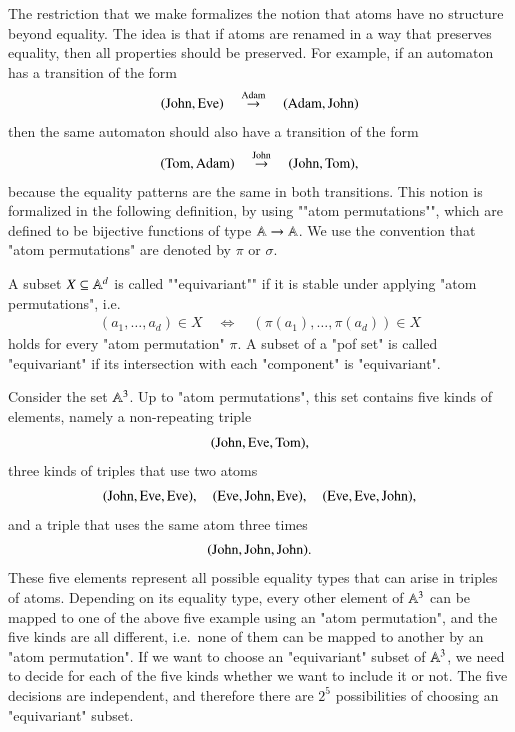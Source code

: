 The restriction that we make formalizes the  notion that atoms have no structure beyond equality. The idea is that if atoms are renamed in a way that preserves equality, then  all properties should be preserved. For example, if an automaton has a transition of the form  
\begin{align*}
(\text{John}, \text{Eve}) 
\quad \stackrel {\text{Adam}} \to \quad 
(\text{Adam}, \text{John})
\end{align*}
then the same automaton should also have a transition of the form 
\begin{align*}
    (\text{Tom}, \text{Adam}) 
    \quad \stackrel {\text{John}} \to \quad 
    (\text{John}, \text{Tom}),
    \end{align*}
because the equality patterns are the same in both transitions. This notion is formalized in the following definition, by using ""atom permutations"", which are  defined to be bijective functions of type $\mathbb A \to \mathbb A$. We use the convention that "atom permutations" are denoted by $\pi$ or $\sigma$. 

\begin{definition}\label{def:equivariant-pof}   
    A subset $X \subseteq \mathbb A^d$ is called ""equivariant"" if it is stable under applying "atom permutations", i.e. 
    \begin{align*}
    (a_1,\ldots,a_d) \in X 
    \quad \Leftrightarrow \quad
    (\pi(a_1),\ldots,\pi(a_d)) \in X
    \end{align*}
    holds for every "atom permutation"  $\pi$. A subset of a "pof set" is called "equivariant" if its intersection with each "component" is "equivariant".
\end{definition}

\begin{myexample}\label{ex:pof-orbits-3}
    Consider the set $\mathbb A^3$. Up to "atom permutations", this set contains five kinds of  elements, namely a non-repeating triple 
    \begin{align*}
    (\text{John},\text{Eve},\text{Tom}),
    \end{align*}
    three kinds of triples that use two atoms 
    \begin{align*}
    (\text{John},\text{Eve},\text{Eve}), \quad (\text{Eve},\text{John},\text{Eve}), \quad (\text{Eve},\text{Eve}, \text{John}),
    \end{align*}
    and  a triple that uses the same atom three times 
    \begin{align*}
    (\text{John},\text{John},\text{John}).
    \end{align*}
    These five elements represent all possible equality types that can arise in triples of atoms. Depending on its equality type,  every other element of $\mathbb A^3$ can be mapped to one of the above five example using an "atom permutation", and the five kinds are all different, i.e.~none of them can be mapped to another by an "atom permutation". If we want to choose an "equivariant" subset of $\mathbb A^3$, we need to decide for each of the five kinds whether we want to include it or not. The five decisions are independent, and therefore there are $2^5$ possibilities of choosing an "equivariant" subset. 
\end{myexample}

